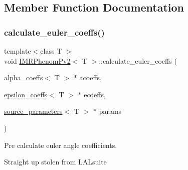 \subsection{Member Function Documentation}
\mbox{\label{classIMRPhenomPv2_afc0f88c773f46ab060482bc530f60115}} 
\subsubsection{\texorpdfstring{calculate\+\_\+euler\+\_\+coeffs()}{calculate\_euler\_coeffs()}}
{\footnotesize\ttfamily template$<$class T $>$ \\
void \hyperlink{classIMRPhenomPv2}{I\+M\+R\+Phenom\+Pv2}$<$ T $>$\+::calculate\+\_\+euler\+\_\+coeffs (\begin{DoxyParamCaption}\item[{\hyperlink{structalpha__coeffs}{alpha\+\_\+coeffs}$<$ T $>$ $\ast$}]{acoeffs,  }\item[{\hyperlink{structepsilon__coeffs}{epsilon\+\_\+coeffs}$<$ T $>$ $\ast$}]{ecoeffs,  }\item[{\hyperlink{structsource__parameters}{source\+\_\+parameters}$<$ T $>$ $\ast$}]{params }\end{DoxyParamCaption})\hspace{0.3cm}{\ttfamily [virtual]}}



Pre calculate euler angle coefficients. 

Straight up stolen from L\+A\+Lsuite \mbox{\label{classIMRPhenomPv2_a6b27bd676726358b699a35cfbd10fe79}} 
